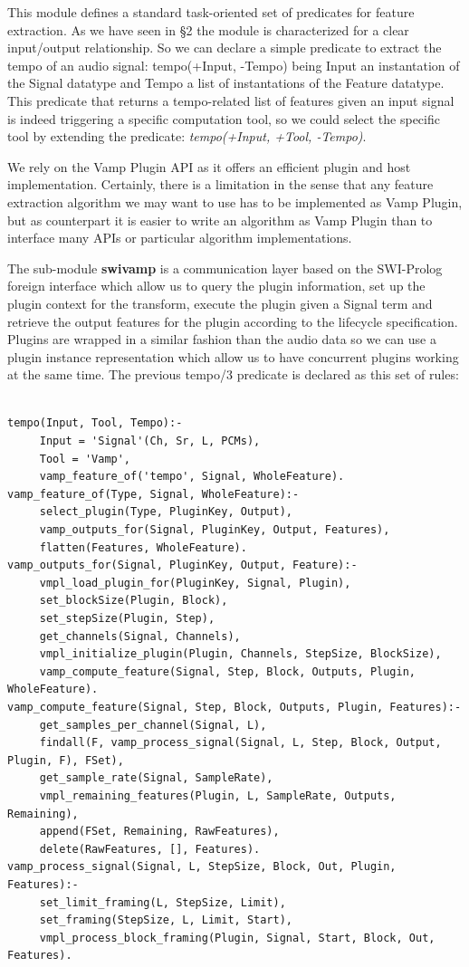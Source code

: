 \documentclass[runningheads]{llncs}
\begin{document}
This module defines a standard task-oriented set of predicates for feature extraction. As we have seen in \S 2 the module is characterized for a clear input/output relationship. So we can declare a simple predicate to extract the tempo of an audio signal: tempo(+Input, -Tempo) being Input an instantation of the Signal datatype and Tempo a list of instantations of the Feature datatype. This predicate that returns a tempo-related list of features given an input signal is indeed triggering a specific computation tool, so we could select the specific tool by extending the predicate: \textit{tempo(+Input, +Tool, -Tempo)}.

We rely on the Vamp Plugin API as it offers an efficient plugin and host implementation. Certainly, there is a limitation in the sense that any feature extraction algorithm we may want to use has to be implemented as Vamp Plugin, but as counterpart it is easier to write an algorithm as Vamp Plugin than to interface many APIs or particular algorithm implementations.

The sub-module \textbf{swivamp} is a communication layer based on the SWI-Prolog foreign interface which allow us to query the plugin information, set up the plugin context for the transform, execute the plugin given a Signal term and retrieve the output features for the plugin according to the lifecycle specification. Plugins are wrapped in a similar fashion than the audio data so we can use a plugin instance representation which allow us to have concurrent plugins working at the same time. The previous tempo/3 predicate is declared as this set of rules:

\medskip

\noindent

\begin{verbatim}

tempo(Input, Tool, Tempo):-
     Input = 'Signal'(Ch, Sr, L, PCMs),
     Tool = 'Vamp',
     vamp_feature_of('tempo', Signal, WholeFeature).
vamp_feature_of(Type, Signal, WholeFeature):-
     select_plugin(Type, PluginKey, Output),
     vamp_outputs_for(Signal, PluginKey, Output, Features),
     flatten(Features, WholeFeature).
vamp_outputs_for(Signal, PluginKey, Output, Feature):-
     vmpl_load_plugin_for(PluginKey, Signal, Plugin),
     set_blockSize(Plugin, Block),
     set_stepSize(Plugin, Step),
     get_channels(Signal, Channels),
     vmpl_initialize_plugin(Plugin, Channels, StepSize, BlockSize),
     vamp_compute_feature(Signal, Step, Block, Outputs, Plugin, WholeFeature).
vamp_compute_feature(Signal, Step, Block, Outputs, Plugin, Features):-
     get_samples_per_channel(Signal, L),
     findall(F, vamp_process_signal(Signal, L, Step, Block, Output, Plugin, F), FSet),
     get_sample_rate(Signal, SampleRate),
     vmpl_remaining_features(Plugin, L, SampleRate, Outputs, Remaining),
     append(FSet, Remaining, RawFeatures),
     delete(RawFeatures, [], Features).
vamp_process_signal(Signal, L, StepSize, Block, Out, Plugin, Features):-
     set_limit_framing(L, StepSize, Limit),
     set_framing(StepSize, L, Limit, Start),
     vmpl_process_block_framing(Plugin, Signal, Start, Block, Out, Features).

\end{verbatim}
\noindent
\end{document}

